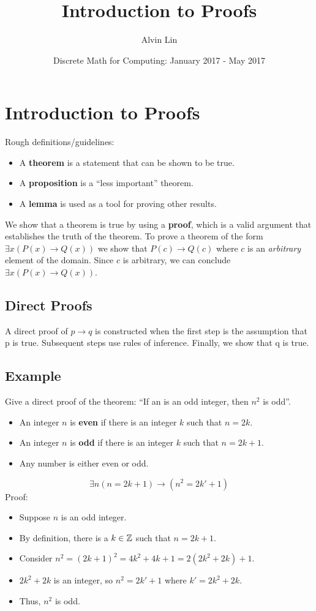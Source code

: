 \documentclass[letterpaper, 12pt]{math}
\title{Introduction to Proofs}
\author{Alvin Lin}
\date{Discrete Math for Computing: January 2017 - May 2017}
\begin{document}
\maketitle

\section*{Introduction to Proofs}
Rough definitions/guidelines:
\begin{itemize}
  \item A \textbf{theorem} is a statement that can be shown to be true.
  \item A \textbf{proposition} is a ``less important'' theorem.
  \item A \textbf{lemma} is used as a tool for proving other results.
\end{itemize}
We show that a theorem is true by using a \textbf{proof}, which is a valid
argument that establishes the truth of the theorem. To prove a theorem
of the form \( \exists{x}(P(x) \to Q(x)) \) we show that \( P(c) \to Q(c) \)
where \( c \) is an \textit{arbitrary} element of the domain. Since \( c \)
is arbitrary, we can conclude \( \exists{x}(P(x) \to Q(x)) \).

\subsection*{Direct Proofs}
A direct proof of \( p \to q \) is constructed when the first step is the
assumption that p is true. Subsequent steps use rules of inference. Finally,
we show that q is true.

\subsection*{Example}
Give a direct proof of the theorem: ``If an is an odd integer, then \( n^{2} \)
is odd''.
\begin{itemize}
  \item An integer \( n \) is \textbf{even} if there is an integer \( k \) such
  that \( n = 2k \).
  \item An integer \( n \) is \textbf{odd} if there is an integer \( k \) such
  that \( n = 2k+1 \).
  \item Any number is either even or odd.
\end{itemize}
\[ \exists{n}(n = 2k+1) \to (n^{2} = 2k'+1) \]
Proof:
\begin{itemize}
  \item Suppose \( n \) is an odd integer.
  \item By definition, there is a \( k \in \mathbb{Z} \) such that \( n = 2k+1 \).
  \item Consider \( n^{2} = (2k+1)^{2} = 4k^{2}+4k+1 = 2(2k^{2}+2k)+1 \).
  \item \( 2k^{2}+2k \) is an integer, so \( n^{2} = 2k'+1 \) where
    \( k' = 2k^{2}+2k \).
  \item Thus, \( n^{2} \) is odd.
\end{itemize}
\end{document}
